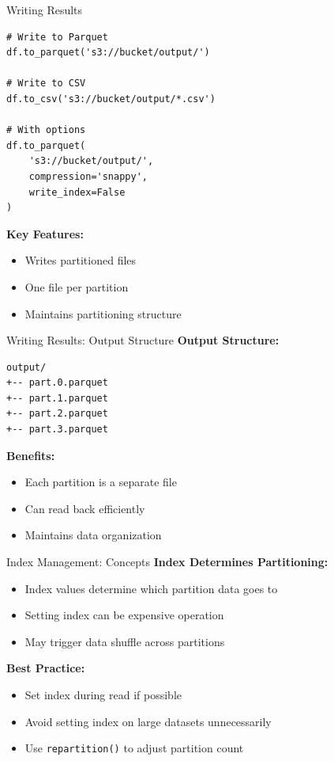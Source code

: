 \documentclass[aspectratio=169]{beamer}
\begin{document}
\begin{frame}[fragile]{Writing Results}
\small
\begin{lstlisting}
# Write to Parquet
df.to_parquet('s3://bucket/output/')

# Write to CSV
df.to_csv('s3://bucket/output/*.csv')

# With options
df.to_parquet(
    's3://bucket/output/',
    compression='snappy',
    write_index=False
)
\end{lstlisting}

\textbf{Key Features:}
\begin{itemize}
    \item Writes partitioned files
    \item One file per partition
    \item Maintains partitioning structure
\end{itemize}
\end{frame}

\begin{frame}[fragile]{Writing Results: Output Structure}
\small
\textbf{Output Structure:}
\begin{verbatim}
output/
+-- part.0.parquet
+-- part.1.parquet
+-- part.2.parquet
+-- part.3.parquet
\end{verbatim}

\vspace{0.2cm}
\textbf{Benefits:}
\begin{itemize}
    \item Each partition is a separate file
    \item Can read back efficiently
    \item Maintains data organization
\end{itemize}
\end{frame}

\begin{frame}{Index Management: Concepts}
\small
\textbf{Index Determines Partitioning:}
\begin{itemize}
    \item Index values determine which partition data goes to
    \item Setting index can be expensive operation
    \item May trigger data shuffle across partitions
\end{itemize}

\vspace{0.2cm}
\textbf{Best Practice:}
\begin{itemize}
    \item Set index during read if possible
    \item Avoid setting index on large datasets unnecessarily
    \item Use \texttt{repartition()} to adjust partition count
\end{itemize}
\end{frame}
\end{document}
